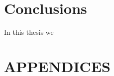\documentclass[letterpaper,12pt,titlepage,oneside,final]{report}
\newcommand{\href}[1]{#1} %
\begin{document}


\chapter{Conclusions}
In this thesis we







\appendix
\chapter*{APPENDICES}




\end{document}
